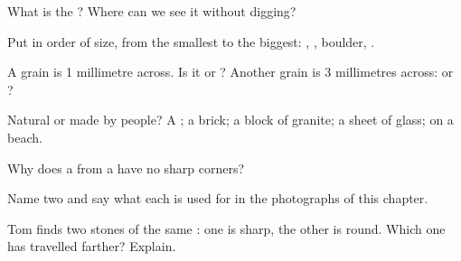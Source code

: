 \begin{exercise}[$\star$]\label{exo:g3:stones-pebbles-sand:1}
What is the ? Where can we see it without digging?
\end{exercise}

\begin{exercise}[$\star$]\label{exo:g3:stones-pebbles-sand:2}
Put in order of size, from the smallest to the biggest: , ,
boulder, .
\end{exercise}

\begin{exercise}[$\star$]\label{exo:g3:stones-pebbles-sand:3}
A grain is 1 millimetre across. Is it  or ? Another grain is
3 millimetres across:  or ?
\end{exercise}

\begin{exercise}[$\star$]\label{exo:g3:stones-pebbles-sand:4}
Natural or made by people? A ; a brick; a block of granite; a sheet
of glass;  on a beach.
\end{exercise}

\begin{exercise}[$\star$]\label{exo:g3:stones-pebbles-sand:5}
Why does a  from a  have no sharp corners?
\end{exercise}

\begin{exercise}[$\star$]\label{exo:g3:stones-pebbles-sand:6}
Name two  and say what each is used for in the photographs
of this chapter.
\end{exercise}

\begin{exercise}[$\star\star$]\label{exo:g3:stones-pebbles-sand:7}
Tom finds two stones of the same : one is sharp, the other is round.
Which one has travelled farther? Explain.
\end{exercise}

